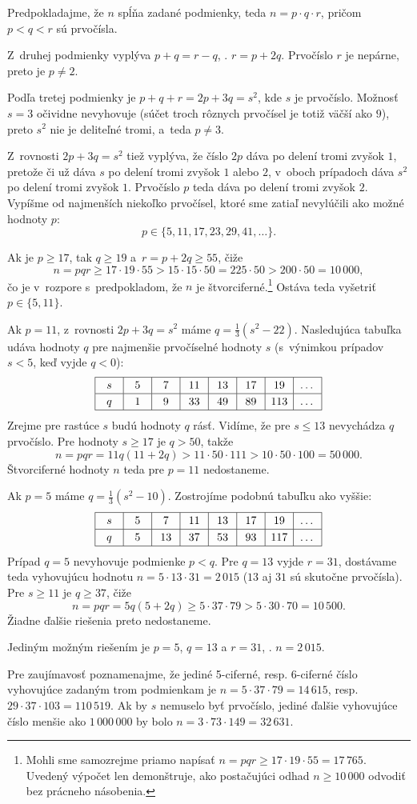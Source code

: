 {%
Predpokladajme, že $n$ spĺňa zadané podmienky, teda $n=p\cdot q\cdot r$, pričom $p<q<r$ sú prvočísla.

Z~druhej podmienky vyplýva $p+q=r-q$, \tj. $r=p+2q$. Prvočíslo $r$ je nepárne, preto je $p\ne 2$.

Podľa tretej podmienky je $p+q+r=2p+3q=s^2$, kde $s$ je prvočíslo. Možnosť $s=3$ očividne nevyhovuje (súčet troch rôznych prvočísel je totiž väčší ako $9$), preto $s^2$ nie je deliteľné tromi, a~teda $p\ne 3$.

Z~rovnosti $2p+3q=s^2$ tiež vyplýva, že číslo $2p$ dáva po delení tromi zvyšok $1$, pretože či už dáva $s$ po delení tromi zvyšok $1$ alebo $2$, v~oboch prípadoch dáva $s^2$ po delení tromi zvyšok $1$. Prvočíslo $p$ teda dáva po delení tromi zvyšok $2$. Vypíšme od najmenších niekoľko prvočísel, ktoré sme zatiaľ nevylúčili ako možné hodnoty $p$:
$$
p\in\{5,11,17,23,29,41, \dots\}.
$$

Ak je $p\ge17$, tak $q\ge19$ a~$r=p+2q\ge55$, čiže
$$
n=pqr\ge17\cdot19\cdot55>15\cdot15\cdot50=225\cdot50>200\cdot50=10\,000,
$$
čo je v~rozpore s~predpokladom, že $n$ je štvorciferné.\footnote{Mohli sme samozrejme priamo napísať $n=pqr\ge17\cdot19\cdot55=17\,765$. Uvedený výpočet len demonštruje, ako postačujúci odhad $n\ge10\,000$ odvodiť bez prácneho násobenia.} Ostáva teda vyšetriť $p\in\{5,11\}$.

Ak $p=11$, z~rovnosti $2p+3q=s^2$ máme $q=\frac13(s^2-22)$. Nasledujúca tabuľka udáva hodnoty $q$ pre najmenšie prvočíselné hodnoty $s$ (s~výnimkou prípadov $s<5$, keď vyjde $q<0$):
$$
\vbox{\offinterlineskip
       \halign{\strut\vrule\hbox to 2.5em{\hss$#$\hss}\vrule&&\hbox to 2.5em{\hss$#$\hss}\vrule\cr
\noalign{\hrule}
 s & 5 & 7 & 11 & 13 & 17 &  19 & \dots\cr
\noalign{\hrule}
 q & 1 & 9 & 33 & 49 & 89 & 113 & \dots\cr
\noalign{\hrule}
}}
$$
Zrejme pre rastúce $s$ budú hodnoty $q$ rásť. Vidíme, že pre $s\le13$ nevychádza $q$ prvočíslo. Pre hodnoty $s\ge17$ je $q>50$, takže
$$
n=pqr=11q(11+2q)>11\cdot50\cdot111>10\cdot50\cdot100=50\,000.
$$
Štvorciferné hodnoty $n$ teda pre $p=11$ nedostaneme.

Ak $p=5$ máme $q=\frac13(s^2-10)$. Zostrojíme podobnú tabuľku ako vyššie:
$$
\vbox{\offinterlineskip
       \halign{\strut\vrule\hbox to 2.5em{\hss$#$\hss}\vrule&&\hbox to 2.5em{\hss$#$\hss}\vrule\cr
\noalign{\hrule}
 s & 5 & 7 & 11 & 13 & 17 &  19 & \dots\cr
\noalign{\hrule}
 q & 5 & 13 & 37 & 53 & 93 & 117 & \dots\cr
\noalign{\hrule}
}}
$$
Prípad $q=5$ nevyhovuje podmienke $p<q$. Pre $q=13$ vyjde $r=31$, dostávame teda vyhovujúcu hodnotu $n={5\cdot13\cdot31}=2\,015$ ($13$ aj $31$ sú skutočne prvočísla). Pre $s\ge11$ je $q\ge37$, čiže
$$
n=pqr=5q(5+2q)\ge5\cdot37\cdot79>5\cdot30\cdot70=10\,500.
$$
Žiadne ďalšie riešenia preto nedostaneme.

\odpoved
Jediným možným riešením je $p=5$, $q=13$ a $r=31$, \tj. $n=2\,015$.

\poznamka
Pre zaujímavosť poznamenajme, že jediné 5-ciferné, resp. 6-ciferné číslo vyhovujúce zadaným trom podmienkam je $n=5\cdot37\cdot79=14\,615$, resp. $29\cdot37\cdot103=110\,519$. Ak by $s$ nemuselo byť prvočíslo, jediné ďalšie vyhovujúce číslo menšie ako $1\,000\,000$ by bolo $n=3\cdot73\cdot 149=32\,631$.
}


